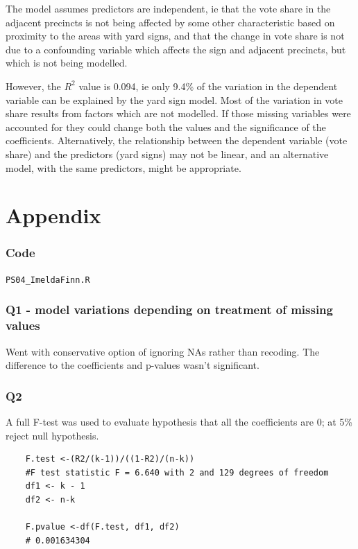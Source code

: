 \documentclass[12pt,letterpaper]{article}
\begin{document}
\begin{enumerate}
The model assumes predictors are independent, ie that the vote share in the adjacent precincts is not being affected by some other characteristic based on proximity to the areas with yard signs, and that the change in vote share is not due to a confounding variable which affects the sign and adjacent precincts, but which is not being modelled.


  However, the $R^2$ value is 0.094, ie only 9.4\% of the variation in the dependent variable can be explained by the yard sign model.  Most of the variation in vote share results from factors which are not modelled.  If those missing variables were accounted for they could change both the values and the significance of the coefficients.   Alternatively, the relationship between the dependent variable (vote share) and the predictors (yard signs) may not be linear, and an alternative model, with the same predictors, might be appropriate.

  
\end{enumerate}  

\newpage
\section{Appendix}
  \subsubsection{Code}
  \verb|PS04_ImeldaFinn.R|
  
  
  \subsubsection*{Q1 - model variations depending on treatment of missing values}
  
  Went with conservative option of ignoring NAs rather than recoding.  
  The difference to the coefficients and p-values wasn't significant.
	 


  

  \subsubsection*{Q2}

	A full F-test was used to evaluate hypothesis that all the coefficients are 0; at 5\% reject null hypothesis.
	
	\begin{lstlisting}
  	F.test <-(R2/(k-1))/((1-R2)/(n-k))
    #F test statistic F = 6.640 with 2 and 129 degrees of freedom
    df1 <- k - 1
    df2 <- n-k

    F.pvalue <-df(F.test, df1, df2)
    # 0.001634304
	\end{lstlisting}
\end{document}
